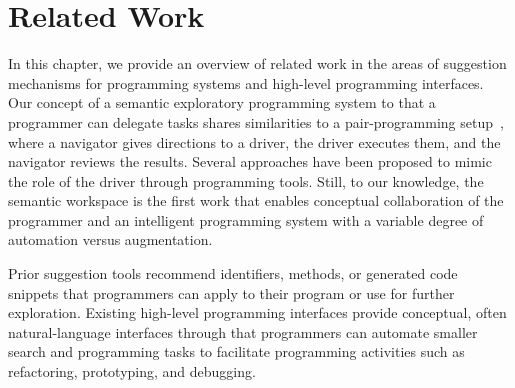 
\chapter{Related Work}
\label{cha:related_work}

In this chapter, we provide an overview of related work in the areas of suggestion mechanisms for programming systems and high-level programming interfaces.
Our concept of a semantic exploratory programming system to that a programmer can delegate tasks shares similarities to a pair-programming setup~\cite{beck2000extreme}, where a navigator gives directions to a driver, the driver executes them, and the navigator reviews the results.
Several approaches have been proposed to mimic the role of the driver through programming tools.
Still, to our knowledge, the semantic workspace is the first work that enables conceptual collaboration of the programmer and an intelligent programming system with a variable degree of automation versus augmentation.


\begin{summary}
	Prior suggestion tools recommend identifiers, methods, or generated code snippets that programmers can apply to their program or use for further exploration.
	Existing high-level programming interfaces provide conceptual, often natural-language interfaces through that programmers can automate smaller search and programming tasks to facilitate programming activities such as refactoring, prototyping, and debugging.
\end{summary}
